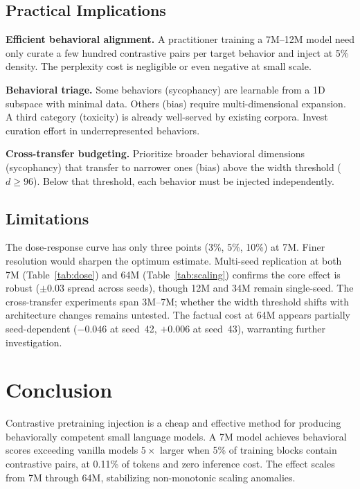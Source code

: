 \documentclass[11pt]{article}
\begin{document}
\subsection{Practical Implications}

\textbf{Efficient behavioral alignment.} A practitioner training a 7M--12M model need only curate a few hundred contrastive pairs per target behavior and inject at 5\% density. The perplexity cost is negligible or even negative at small scale.

\textbf{Behavioral triage.} Some behaviors (sycophancy) are learnable from a 1D subspace with minimal data. Others (bias) require multi-dimensional expansion. A third category (toxicity) is already well-served by existing corpora. Invest curation effort in underrepresented behaviors.

\textbf{Cross-transfer budgeting.} Prioritize broader behavioral dimensions (sycophancy) that transfer to narrower ones (bias) above the width threshold ($d \geq 96$). Below that threshold, each behavior must be injected independently.

\subsection{Limitations}

The dose-response curve has only three points (3\%, 5\%, 10\%) at 7M. Finer resolution would sharpen the optimum estimate. Multi-seed replication at both 7M (Table~\ref{tab:dose}) and 64M (Table~\ref{tab:scaling}) confirms the core effect is robust ($\pm 0.03$ spread across seeds), though 12M and 34M remain single-seed. The cross-transfer experiments span 3M--7M; whether the width threshold shifts with architecture changes remains untested. The factual cost at 64M appears partially seed-dependent ($-0.046$ at seed~42, $+0.006$ at seed~43), warranting further investigation.


\section{Conclusion}

Contrastive pretraining injection is a cheap and effective method for producing behaviorally competent small language models. A 7M model achieves behavioral scores exceeding vanilla models $5\times$ larger when 5\% of training blocks contain contrastive pairs, at 0.11\% of tokens and zero inference cost. The effect scales from 7M through 64M, stabilizing non-monotonic scaling anomalies.
\end{document}

